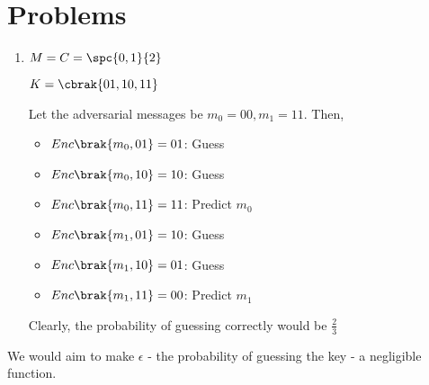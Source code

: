 \documentclass{amsart}
\begin{document}
    \section{Problems}

    \begin{enumerate}
        \item 
        \(M = C = \spc{0, 1}{2}\)

        \(K = \cbrak{01, 10, 11}\)

        Let the adversarial messages be \(m_0 = 00, m_1 = 11\). Then, 
        \begin{itemize}
            \item \(Enc\brak{m_0, 01} = 01\): Guess
            \item \(Enc\brak{m_0, 10} = 10\): Guess
            \item \(Enc\brak{m_0, 11} = 11\): Predict \(m_0\)
            \item \(Enc\brak{m_1, 01} = 10\): Guess
            \item \(Enc\brak{m_1, 10} = 01\): Guess
            \item \(Enc\brak{m_1, 11} = 00\): Predict \(m_1\)
        \end{itemize}

        Clearly, the probability of guessing correctly would be \(\frac{2}{3}\)
    \end{enumerate}


    We would aim to make \(\epsilon\) - the probability of guessing the key - a negligible function.

    
\end{document}
